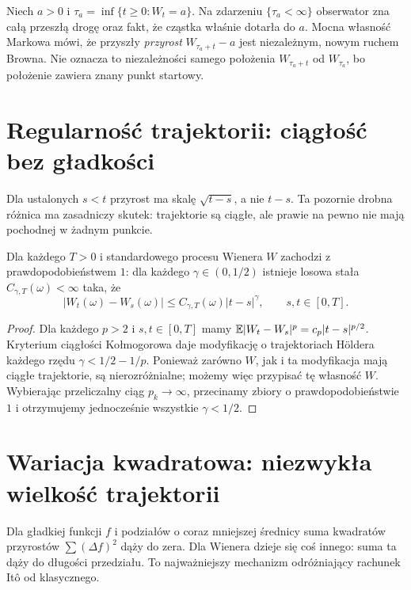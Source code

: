 \begin{przyklad}
Niech $a>0$ i $\tau_a=\inf\{t\ge0:W_t=a\}$.
Na zdarzeniu $\{\tau_a<\infty\}$ obserwator zna
całą przeszłą drogę oraz fakt, że cząstka właśnie dotarła
do $a$. Mocna własność Markowa mówi, że przyszły \emph{przyrost}
$W_{\tau_a+t}-a$ jest niezależnym, nowym ruchem Browna.
Nie oznacza to niezależności samego położenia $W_{\tau_a+t}$
od $W_{\tau_a}$, bo położenie zawiera znany punkt startowy.
\end{przyklad}

\section{Regularność trajektorii: ciągłość bez gładkości}
Dla ustalonych $s<t$ przyrost ma skalę $\sqrt{t-s}$,
a nie $t-s$. Ta pozornie drobna różnica ma zasadniczy
skutek: trajektorie są ciągłe, ale prawie na pewno nie
mają pochodnej w żadnym punkcie.

\begin{twierdzenie}
Dla każdego $T>0$ i standardowego procesu Wienera $W$
zachodzi z prawdopodobieństwem $1$: dla każdego
$\gamma\in(0,1/2)$ istnieje losowa stała
$C_{\gamma,T}(\omega)<\infty$ taka, że
\[
|W_t(\omega)-W_s(\omega)|
\le C_{\gamma,T}(\omega)|t-s|^\gamma,
\qquad s,t\in[0,T].
\]
\end{twierdzenie}
\begin{proof}
Dla każdego $p>2$ i $s,t\in[0,T]$ mamy
$\mathbb{E}|W_t-W_s|^p=c_p|t-s|^{p/2}$.
Kryterium ciągłości Kołmogorowa daje modyfikację
o trajektoriach H\"oldera każdego rzędu
$\gamma<1/2-1/p$. Ponieważ zarówno $W$, jak i ta
modyfikacja mają ciągłe trajektorie, są nierozróżnialne;
możemy więc przypisać tę własność $W$.
Wybierając przeliczalny ciąg $p_k\to\infty$,
przecinamy zbiory o prawdopodobieństwie $1$ i
otrzymujemy jednocześnie wszystkie $\gamma<1/2$.
\end{proof}

\section{Wariacja kwadratowa: niezwykła wielkość trajektorii}
Dla gładkiej funkcji $f$ i podziałów o coraz mniejszej
średnicy suma kwadratów przyrostów $\sum(\Delta f)^2$
dąży do zera. Dla Wienera dzieje się coś innego:
suma ta dąży do długości przedziału. To najważniejszy
mechanizm odróżniający rachunek Itô od klasycznego.

